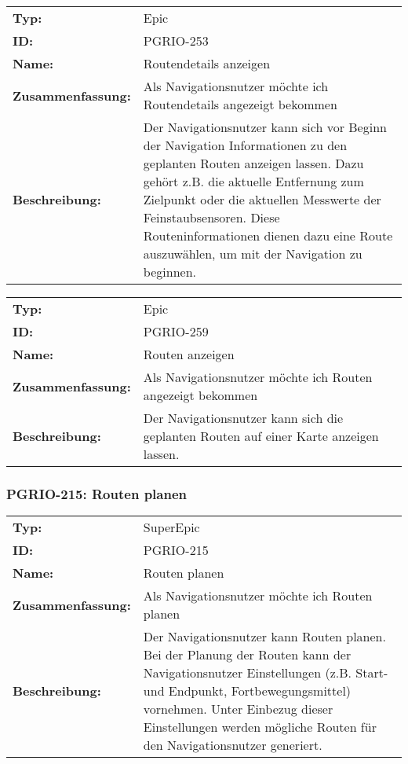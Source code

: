 		\begin{flushleft} 
\begin{tabular}{@{}lp{100mm}} 
\textbf{Typ:} & Epic \\ 
\textbf{ID:} & PGRIO-253 \\ 
\textbf{Name:} & Routendetails anzeigen \\ 
\textbf{Zusammenfassung:} & Als Navigationsnutzer möchte ich Routendetails angezeigt bekommen \\ 
\textbf{Beschreibung:} & Der Navigationsnutzer kann sich vor Beginn der Navigation Informationen zu den geplanten Routen anzeigen lassen. Dazu gehört z.B. die aktuelle Entfernung zum Zielpunkt oder die aktuellen Messwerte der Feinstaubsensoren. Diese Routeninformationen dienen dazu eine Route auszuwählen, um mit der Navigation zu beginnen. \\ 
\end{tabular} 
\end{flushleft} 

		\begin{flushleft} 
\begin{tabular}{@{}lp{100mm}} 
\textbf{Typ:} & Epic \\ 
\textbf{ID:} & PGRIO-259 \\ 
\textbf{Name:} & Routen anzeigen \\ 
\textbf{Zusammenfassung:} & Als Navigationsnutzer möchte ich Routen angezeigt bekommen \\ 
\textbf{Beschreibung:} & Der Navigationsnutzer kann sich die geplanten Routen auf einer Karte anzeigen lassen. \\ 
\end{tabular} 
\end{flushleft} 

	\subsubsection{PGRIO-215: Routen planen} 
\begin{flushleft} 
\begin{tabular}{@{}lp{100mm}} 
\textbf{Typ:} & SuperEpic \\ 
\textbf{ID:} & PGRIO-215 \\ 
\textbf{Name:} & Routen planen \\ 
\textbf{Zusammenfassung:} & Als Navigationsnutzer möchte ich Routen planen \\ 
\textbf{Beschreibung:} & Der Navigationsnutzer kann Routen planen. Bei der Planung der Routen kann der Navigationsnutzer Einstellungen (z.B. Start- und Endpunkt, Fortbewegungsmittel) vornehmen. Unter Einbezug dieser Einstellungen werden mögliche Routen für den Navigationsnutzer generiert. \\ 
\end{tabular} 
\end{flushleft} 

